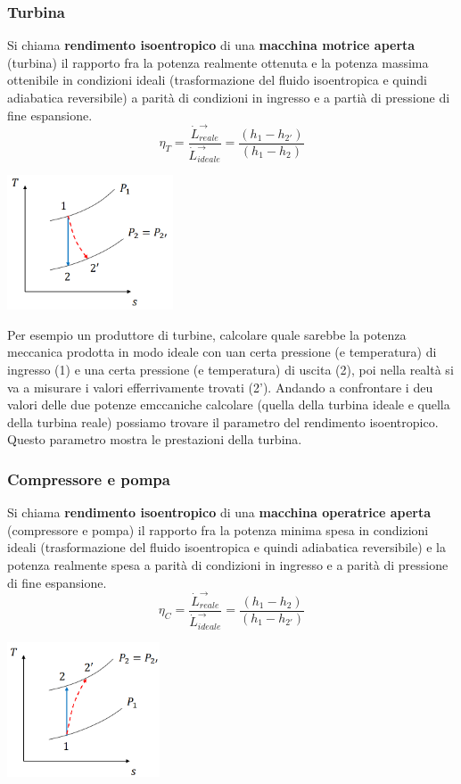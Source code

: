 \subsubsection{Turbina}
Si chiama \textbf{rendimento isoentropico} di una \textbf{macchina motrice aperta} (turbina) il rapporto fra la potenza realmente ottenuta e la potenza massima ottenibile in condizioni ideali (trasformazione del fluido isoentropica e quindi adiabatica reversibile) a parità di condizioni in ingresso e a partià di pressione di fine espansione.
\[
    \eta_T = \frac{\dot{L}_{reale}^\rightarrow}{\dot{L}_{ideale}^\rightarrow } = \frac{(h_1-h_{2'})}{(h_1-h_2)}
\]
\begin{center}
    \includegraphics[height=4cm]{../L06/img8.PNG}
\end{center}
Per esempio un produttore di turbine, calcolare quale sarebbe la potenza meccanica prodotta in modo ideale con uan certa pressione (e temperatura) di ingresso (1) e una certa pressione (e temperatura) di uscita (2), poi nella realtà si va a misurare i valori efferrivamente trovati (2'). Andando a confrontare i deu valori delle due potenze emccaniche calcolare (quella della turbina ideale e quella della turbina reale) possiamo trovare il parametro del rendimento isoentropico. Questo parametro mostra le prestazioni della turbina.
\subsubsection{Compressore e pompa}
Si chiama \textbf{rendimento isoentropico} di una \textbf{macchina operatrice aperta} (compressore e pompa) il rapporto fra la potenza minima spesa in condizioni ideali (trasformazione del fluido isoentropica e quindi adiabatica reversibile) e la potenza realmente spesa a parità di condizioni in ingresso e a parità di pressione di fine espansione.
\[
    \eta_C =  \frac{\dot{L}_{reale}^\rightarrow}{\dot{L}_{ideale}^\rightarrow } = \frac{(h_1-h_2)}{(h_1-h_{2'})}
\]
\begin{center}
    \includegraphics[height=4cm]{../L06/img9.PNG}
\end{center}
